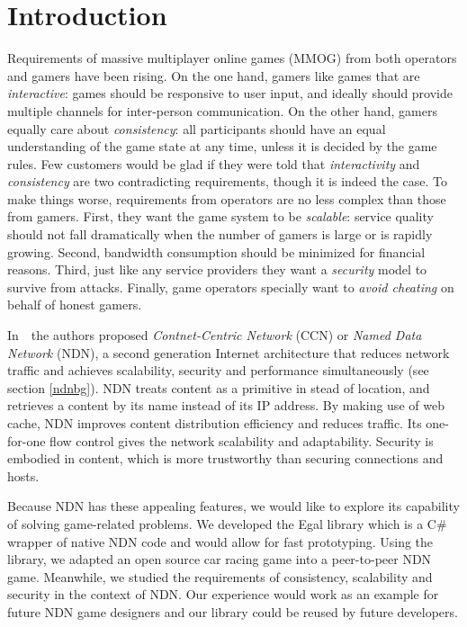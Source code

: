 \chapter{Introduction}
\label{introduction}

Requirements of massive multiplayer online games (MMOG) from both operators and gamers have been rising. On the one hand, gamers like games that are \emph{interactive}: games should be responsive to user input, and ideally should provide multiple channels for inter-person communication. On the other hand, gamers equally care about \emph{consistency}: all participants should have an equal understanding of the game state at any time, unless it is decided by the game rules. Few customers would be glad if they were told that \emph{interactivity} and \emph{consistency} are two contradicting requirements, though it is indeed the case. To make things worse, requirements from operators are no less complex than those from gamers. First, they want the game system to be \emph{scalable}: service quality should not fall dramatically when the number of gamers is large or is rapidly growing. Second, bandwidth consumption should be minimized for financial reasons. Third, just like any service providers they want a \emph{security} model to survive from attacks. Finally, game operators specially want to \emph{avoid cheating} on behalf of honest gamers.

In~\cite{Jndn}~the authors proposed \emph{Contnet-Centric Network} (CCN) or \emph{Named Data Network} (NDN), a second generation Internet architecture that reduces network traffic and achieves scalability, security and performance simultaneously (see section \ref{ndnbg}). NDN treats content as a primitive in stead of location, and retrieves a content by its name instead of its IP address. By making use of web cache, NDN improves content distribution efficiency and reduces traffic. Its one-for-one flow control gives the network scalability and adaptability. Security is embodied in content, which is more trustworthy than securing connections and hosts.

Because NDN has these appealing features, we would like to explore its capability of solving game-related problems. We developed the Egal library which is a C\# wrapper of native NDN code and would allow for fast prototyping. Using the library, we adapted an open source car racing game into a peer-to-peer NDN game. Meanwhile, we studied the requirements of consistency, scalability and security in the context of NDN. Our experience would work as an example for future NDN game designers and our library could be reused by future developers.

